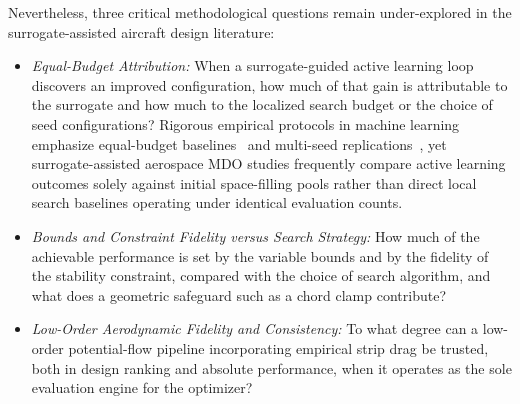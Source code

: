 Nevertheless, three critical methodological questions remain under-explored in the surrogate-assisted aircraft design literature:
\begin{itemize}
    \item \textit{Equal-Budget Attribution:} When a surrogate-guided active learning loop discovers an improved configuration, how much of that gain is attributable to the surrogate and how much to the localized search budget or the choice of seed configurations? Rigorous empirical protocols in machine learning emphasize equal-budget baselines~\cite{bergstra2012random} and multi-seed replications~\cite{henderson2018deep}, yet surrogate-assisted aerospace MDO studies frequently compare active learning outcomes solely against initial space-filling pools rather than direct local search baselines operating under identical evaluation counts.
    \item \textit{Bounds and Constraint Fidelity versus Search Strategy:} How much of the achievable performance is set by the variable bounds and by the fidelity of the stability constraint, compared with the choice of search algorithm, and what does a geometric safeguard such as a chord clamp contribute?
    \item \textit{Low-Order Aerodynamic Fidelity and Consistency:} To what degree can a low-order potential-flow pipeline incorporating empirical strip drag be trusted, both in design ranking and absolute performance, when it operates as the sole evaluation engine for the optimizer?
\end{itemize}

